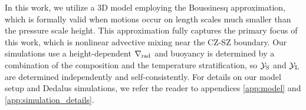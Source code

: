In this work, we utilize a 3D model employing the Boussinesq approximation, which is formally valid when motions occur on length scales much smaller than the pressure scale height.
This approximation fully captures the primary focus of this work, which is nonlinear advective mixing near the CZ-SZ boundary.
Our simulations use a height-dependent $\nabla_{\rm{rad}}$ and buoyancy is determined by a combination of the composition and the temperature stratification, so $\mathcal{Y}_{\rm{S}}$ and $\mathcal{Y}_{\rm{L}}$ are determined independently and self-consistently.
For details on our model setup and Dedalus simulations, we refer the reader to appendices \ref{app:model} and \ref{app:simulation_details}.

